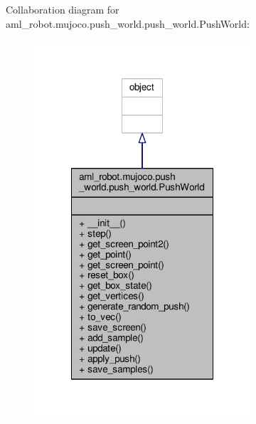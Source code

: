 Collaboration diagram for aml\-\_\-robot.\-mujoco.\-push\-\_\-world.\-push\-\_\-world.\-Push\-World\-:
\nopagebreak
\begin{figure}[H]
\begin{center}
\leavevmode
\includegraphics[width=228pt]{classaml__robot_1_1mujoco_1_1push__world_1_1push__world_1_1_push_world__coll__graph}
\end{center}
\end{figure}
